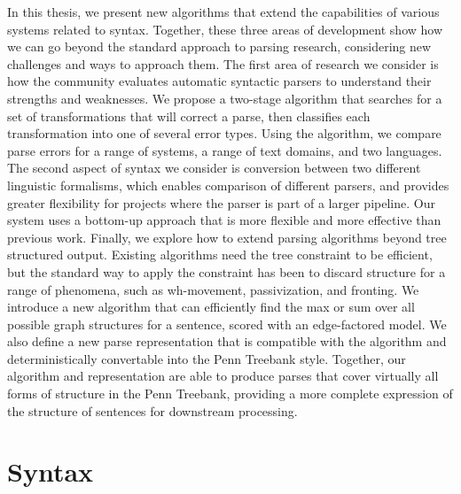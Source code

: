 In this thesis, we present new algorithms that extend the capabilities of various systems related to syntax.
Together, these three areas of development show how we can go beyond the standard approach to parsing research, considering new challenges and ways to approach them.
The first area of research we consider is how the community evaluates automatic syntactic parsers to understand their strengths and weaknesses.
We propose a two-stage algorithm that searches for a set of transformations that will correct a parse, then classifies each transformation into one of several error types.
Using the algorithm, we compare parse errors for a range of systems, a range of text domains, and two languages.
The second aspect of syntax we consider is conversion between two different linguistic formalisms, which enables comparison of different parsers, and provides greater flexibility for projects where the parser is part of a larger pipeline.
Our system uses a bottom-up approach that is more flexible and more effective than previous work.
Finally, we explore how to extend parsing algorithms beyond tree structured output.
Existing algorithms need the tree constraint to be efficient, but the standard way to apply the constraint has been to discard structure for a range of phenomena, such as wh-movement, passivization, and fronting.
We introduce a new algorithm that can efficiently find the max or sum over all possible graph structures for a sentence, scored with an edge-factored model.
We also define a new parse representation that is compatible with the algorithm and deterministically convertable into the Penn Treebank style.
Together, our algorithm and representation are able to produce parses that cover virtually all forms of structure in the Penn Treebank, providing a more complete expression of the structure of sentences for downstream processing.

\section{Syntax}
\label{sec:syntax}

